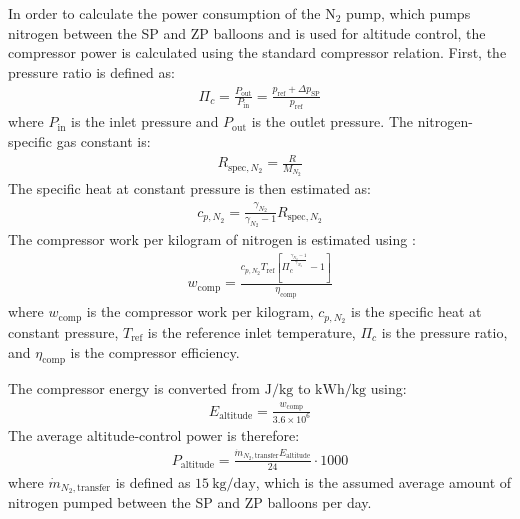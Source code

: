 In order to calculate the power consumption of the N$_2$ pump, which pumps nitrogen between the SP and ZP balloons and is used for altitude control, the compressor power is calculated using the standard compressor relation. First, the pressure ratio is defined as:
\begin{align}
    \Pi_c =
    \frac{P_{\mathrm{out}}}{P_{\mathrm{in}}}
    =
    \frac{p_{\mathrm{ref}}+\Delta p_{\mathrm{SP}}}
    {p_{\mathrm{ref}}}
\end{align}
where $P_{\mathrm{in}}$ is the inlet pressure and $P_{\mathrm{out}}$ is the outlet pressure. The nitrogen-specific gas constant is:
\begin{align}
    R_{\mathrm{spec},N_2} =
    \frac{R}{M_{N_2}}
\end{align}
The specific heat at constant pressure is then estimated as:
\begin{align}
    c_{p,N_2} =
    \frac{\gamma_{N_2}}{\gamma_{N_2}-1}
    R_{\mathrm{spec},N_2}
\end{align}
The compressor work per kilogram of nitrogen is estimated using \cite{NASAGlennCompressor}:
\begin{align}
    w_{\mathrm{comp}} =
    \frac{
    c_{p,N_2} T_{\mathrm{ref}}
    \left[
    \Pi_c^{\frac{\gamma_{N_2}-1}{\gamma_{N_2}}}
    -1
    \right]
    }
    {\eta_{\mathrm{comp}}}
\end{align}
where $w_{\mathrm{comp}}$ is the compressor work per kilogram, $c_{p,N_2}$ is the specific heat at constant pressure, $T_{\mathrm{ref}}$ is the reference inlet temperature, $\Pi_c$ is the pressure ratio, and $\eta_{\mathrm{comp}}$ is the compressor efficiency.

The compressor energy is converted from $\mathrm{J/kg}$ to $\mathrm{kWh/kg}$ using:
\begin{align}
    E_{\mathrm{altitude}} =
    \frac{w_{\mathrm{comp}}}{3.6\times10^6}
\end{align}
The average altitude-control power is therefore:
\begin{align}
    P_{\mathrm{altitude}} =
    \frac{
    \dot{m}_{N_2,\mathrm{transfer}}
    E_{\mathrm{altitude}}
    }
    {24}
    \cdot 1000
\end{align}
where $\dot{m}_{N_2,\mathrm{transfer}}$ is defined as $15~\mathrm{kg/day}$, which is the assumed average amount of nitrogen pumped between the SP and ZP balloons per day.


